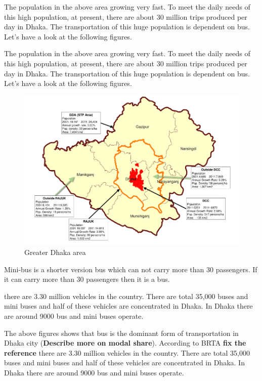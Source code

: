 \documentclass[
  11pt,
]{article}
\begin{document}
The population in the above area growing very fast. To meet the daily
needs of this high population, at present, there are about 30 million
trips produced per day in Dhaka. The transportation of this huge
population is dependent on bus. Let's have a look at the following
figures.

The population in the above area growing very fast. To meet the daily
needs of this high population, at present, there are about 30 million
trips produced per day in Dhaka. The transportation of this huge
population is dependent on bus. Let's have a look at the following
figures.

\begin{figure}  
 \begin{center}
    \includegraphics{./figures/gda.png}  
  \caption{Greater Dhaka area} 
\end{center}
\end{figure}

Mini-bus is a shorter version bus which can not carry more than 30
passengers. If it can carry more than 30 passengers then it is a bus.

there are 3.30 million vehicles in the country. There are total 35,000
buses and mini buses and half of these vehicles are concentrated in
Dhaka. In Dhaka there are around 9000 bus and mini buses operate.

The above figures shows that bus is the dominant form of transportation
in Dhaka city (\textbf{Describe more on modal share}). According to BRTA
\textbf{fix the reference} there are 3.30 million vehicles in the
country. There are total 35,000 buses and mini buses and half of these
vehicles are concentrated in Dhaka. In Dhaka there are around 9000 bus
and mini buses operate.
\end{document}
